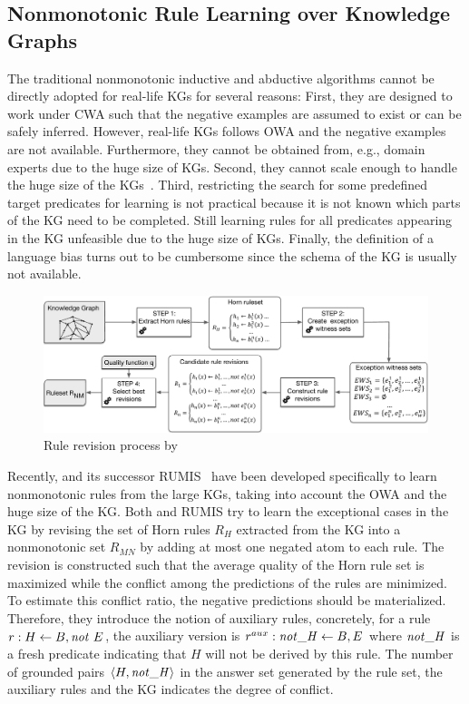 \subsection{Nonmonotonic Rule Learning over Knowledge Graphs}
The traditional nonmonotonic inductive and abductive algorithms cannot be directly adopted for real-life KGs for several reasons:
First, they are designed to work under CWA such that the negative examples are assumed to exist or can be safely inferred. However, real-life KGs follows OWA and the negative examples are not available. Furthermore, they cannot be obtained from, e.g., domain experts due to the huge size of KGs.
Second, they cannot scale enough to handle the huge size of the KGs~\cite{Shakerin2018}. 
Third, restricting the search for some predefined target predicates for learning is not practical because
it is not known which parts of the KG need to be completed. Still learning rules for all predicates appearing in the KG unfeasible due to the huge
size of KGs. Finally,
the definition of a language bias turns out to be cumbersome since the schema of the
KG is usually not available.


\begin{figure}[t]
\centering
\includegraphics[width=\textwidth]{figures/overview}
\caption{Rule revision process by~\cite{gad2016,rumis}}
\label{fig:iswc_process}
\end{figure}
Recently, \cite{gad2016} and its successor RUMIS~\cite{rumis} have been developed specifically to learn nonmonotonic rules from the large KGs, taking into account the OWA and the huge size of the KG. Both \cite{gad2016} and RUMIS try to learn the exceptional cases in the KG by revising the set of Horn rules $R_H$ extracted from the KG into a nonmonotonic set $R_{MN}$ by adding at most one negated atom to each rule. The revision is constructed such that the average quality of the Horn rule set is maximized while the conflict among the predictions of the rules are minimized. To estimate this conflict ratio, the negative predictions should be materialized. Therefore, they introduce the notion of auxiliary rules, concretely, for a rule 
$r:H \leftarrow B, \mathit{not}~ E$, the auxiliary version is $r^{aux}:\mathit{not\_H} \leftarrow B, E$ where $\mathit{not\_H}$ is a fresh predicate indicating that $H$ will not be derived by this rule. The number of grounded pairs $\langle H,\mathit{not\_H}\rangle$ in the answer set generated by the rule set, the auxiliary rules and the KG indicates the degree of conflict.


